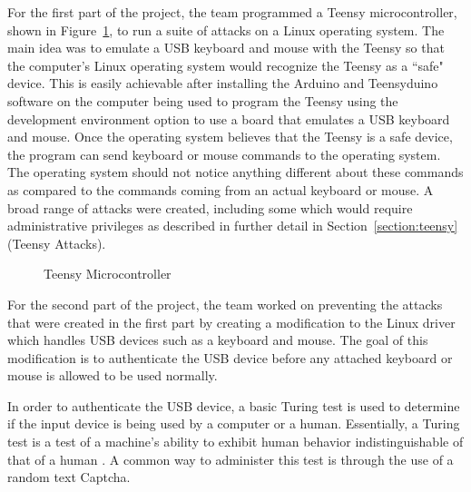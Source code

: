\documentclass[pagenumbers]{ieee}
\begin{document}
For the first part of the project, the team programmed a Teensy microcontroller, shown in Figure~\ref{fig:Teensy}, to run a suite of attacks on a Linux operating system. The main idea was to emulate a USB keyboard and mouse with the Teensy so that the computer's Linux operating system would recognize the Teensy as a ``safe" device. This is easily achievable after installing the Arduino and Teensyduino software on the computer being used to program the Teensy using the development environment option to use a board that emulates a USB keyboard and mouse. Once the operating system believes that the Teensy is a safe device, the program can send keyboard or mouse commands to the operating system. The operating system should not notice anything different about these commands as compared to the commands coming from an actual keyboard or mouse. A broad range of attacks were created, including some which would require administrative privileges as described in further detail in Section~\ref{section:teensy} (Teensy Attacks).

\begin{figure}[H]
   \caption{Teensy Microcontroller}
   \label{fig:Teensy}
\end{figure}

For the second part of the project, the team worked on preventing the attacks that were created in the first part by creating a modification to the Linux driver which handles USB devices such as a keyboard and mouse. The goal of this modification is to authenticate the USB device before any attached keyboard or mouse is allowed to be used normally.

In order to authenticate the USB device, a basic Turing test is used to determine if the input device is being used by a computer or a human. Essentially, a Turing test is a test of a machine's ability to exhibit human behavior indistinguishable of that of a human \cite{turing}. A common way to administer this test is through the use of a random text Captcha. 
\end{document}
